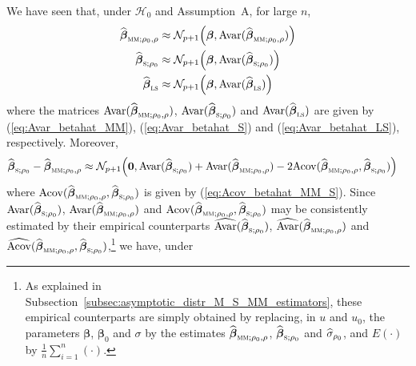 We have seen that, under $\mathcal{H}_0$ and Assumption~A, for large $n$,
%
\begin{align*}
    \sthat{\boldsymbol\beta}_{\stsc{MM};\rho_0,\rho} & \approx 
        \mathcal{N}_{p+1}\left(\boldsymbol\beta, 
        \mathrm{Avar}(\sthat{\boldsymbol\beta}_{\stsc{MM};\rho_0,\rho})\right)
    \\
    \sthat{\boldsymbol\beta}_{\stsc{S};\rho_0} &  \approx
    \mathcal{N}_{p+1}\left(\boldsymbol\beta, 
        \mathrm{Avar}(\widehat{\boldsymbol\beta}_{\stsc{S};\rho_0})\right)
    \\
    \sthat{\boldsymbol\beta}_\stsc{LS} & \approx
        \mathcal{N}_{p+1}\left(\boldsymbol\beta,
        \mathrm{Avar}(\sthat{\boldsymbol\beta}_\stsc{LS})\right)
\end{align*}
%
where the matrices
$\mathrm{Avar}(\sthat{\boldsymbol\beta}_{\stsc{MM};\rho_0,\rho})$,
$\mathrm{Avar}(\widehat{\boldsymbol\beta}_{\stsc{S};\rho_0})$ and
$\mathrm{Avar}(\sthat{\boldsymbol\beta}_\stsc{LS})$ are given by
(\ref{eq:Avar_betahat_MM}), (\ref{eq:Avar_betahat_S}) and
(\ref{eq:Avar_betahat_LS}), respectively. Moreover,
%
\begin{align*}
    \sthat{\boldsymbol\beta}_{\stsc{S};\rho_0} 
        - \widehat{\boldsymbol\beta}_{\stsc{MM};\rho_0,\rho}
     & \approx \mathcal{N}_{p+1}\left(\stvec{0},
         \mathrm{Avar}(\widehat{\boldsymbol\beta}_{\stsc{S};\rho_0})
       + \mathrm{Avar}(\sthat{\boldsymbol\beta}_{\stsc{MM};\rho_0,\rho})
     - 2 \mathrm{Acov}(\sthat{\boldsymbol\beta}_{\stsc{MM};\rho_0,\rho},
             \sthat{\boldsymbol\beta}_{\stsc{S};\rho_0})\right)
\end{align*}
%
where $\mathrm{Acov}(\sthat{\boldsymbol\beta}_{\stsc{MM};\rho_0,\rho},
\sthat{\boldsymbol\beta}_{\stsc{S};\rho_0})$ is given by
(\ref{eq:Acov_betahat_MM_S}). Since
$\mathrm{Avar}(\widehat{\boldsymbol\beta}_{\stsc{S};\rho_0})$,
$\mathrm{Avar}(\sthat{\boldsymbol\beta}_{\stsc{MM};\rho_0,\rho})$ and
$\mathrm{Acov}(\sthat{\boldsymbol\beta}_{\stsc{MM};\rho_0,\rho},
\sthat{\boldsymbol\beta}_{\stsc{S};\rho_0})$ may be consistently estimated by
their empirical counterparts
$\sthat{\mathrm{Avar}}(\widehat{\boldsymbol\beta}_{\stsc{S};\rho_0})$,
$\sthat{\mathrm{Avar}}(\sthat{\boldsymbol\beta}_{\stsc{MM};\rho_0,\rho})$ and
$\sthat{\mathrm{Acov}}(\sthat{\boldsymbol\beta}_{\stsc{MM};\rho_0,\rho},
\sthat{\boldsymbol\beta}_{\stsc{S};\rho_0})$,\footnote{As explained in
Subsection~\ref{subsec:asymptotic_distr_M_S_MM_estimators}, these empirical
counterparts are simply obtained by replacing, in $u$ and $u_0$, the parameters
$\boldsymbol\beta$, $\boldsymbol\beta_0$ and $\sigma$ by the estimates
$\sthat{\boldsymbol\beta}_{\stsc{MM};\rho_0,\rho}$,
$\sthat{\boldsymbol\beta}_{\stsc{S};\rho_0}$ and $\widehat{\sigma}_{\rho_0}$, and
$E(\cdot)$ by $\frac{1}{n} \sum_{i=1}^{n} (\cdot)$.} we have, under
